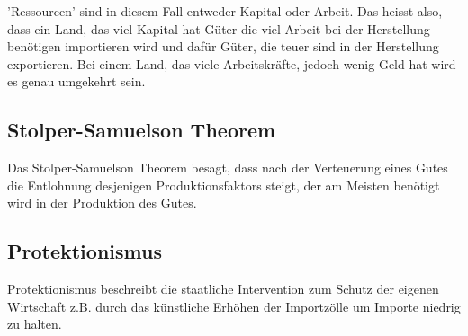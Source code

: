 \documentclass[a4paper, 11pt]{article}
\begin{document}
\vspace{10px}

\noindent 'Ressourcen' sind in diesem Fall entweder Kapital oder Arbeit. Das heisst also, dass ein Land, das viel Kapital hat Güter die viel Arbeit bei der Herstellung benötigen importieren wird und dafür Güter, die teuer sind in der Herstellung exportieren. Bei einem Land, das viele Arbeitskräfte, jedoch wenig Geld hat wird es genau umgekehrt sein. 

\subsection{Stolper-Samuelson Theorem}
Das Stolper-Samuelson Theorem besagt, dass nach der Verteuerung eines Gutes die Entlohnung desjenigen Produktionsfaktors steigt, der am Meisten benötigt wird in der Produktion des Gutes.

\subsection{Protektionismus}

Protektionismus beschreibt die staatliche Intervention zum Schutz der eigenen Wirtschaft z.B. durch das künstliche Erhöhen der Importzölle um Importe niedrig zu halten.
\end{document}

